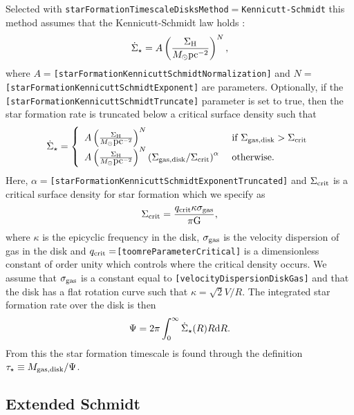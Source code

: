 Selected with {\tt starFormationTimescaleDisksMethod}$=${\tt Kennicutt-Schmidt} this method assumes that the Kennicutt-Schmidt law holds \citep{schmidt_rate_1959,kennicutt_global_1998}:
\begin{equation}
\dot{\Sigma}_\star = A \left({\Sigma_{\rm H} \over M_\odot \hbox{pc}^{-2}} \right)^N,
\end{equation}
where $A=${\tt [starFormationKennicuttSchmidtNormalization]} and $N=${\tt [starFormationKennicuttSchmidtExponent]} are parameters. Optionally, if the {\tt [starFormationKennicuttSchmidtTruncate]} parameter is set to true, then the star formation rate is truncated below a critical surface density such that
\begin{equation}
\dot{\Sigma}_\star = \left\{ \begin{array}{ll} A \left({\Sigma_{\rm H} \over M_\odot \hbox{pc}^{-2}} \right)^N & \hbox{ if } \Sigma_{\rm gas,disk} > \Sigma_{\rm crit} \\ A \left({\Sigma_{\rm H} \over M_\odot \hbox{pc}^{-2}} \right)^N \left(\Sigma_{\rm gas,disk}/\Sigma_{\rm crit}\right)^\alpha & \hbox{ otherwise.} \end{array} \right.
\end{equation}
Here, $\alpha=${\tt [starFormationKennicuttSchmidtExponentTruncated]} and $\Sigma_{\rm crit}$ is a critical surface density for star formation which we specify as
\begin{equation}
\Sigma_{\rm crit} = {q_{\rm crit} \kappa \sigma_{\rm gas} \over \pi \G},
\end{equation}
where $\kappa$ is the epicyclic frequency in the disk, $\sigma_{\rm gas}$ is the velocity dispersion of gas in the disk and $q_{\rm crit}=${\tt [toomreParameterCritical]} is a dimensionless constant of order unity which controls where the critical density occurs. We assume that $\sigma_{\rm gas}$ is a constant equal to {\tt [velocityDispersionDiskGas]} and that the disk has a flat rotation curve such that $\kappa = \sqrt{2} V/R$. The integrated star formation rate over the disk is then
\begin{equation}
\Psi = 2 \pi \int_0^\infty \dot{\Sigma}_\star(R) R \d R.
\end{equation}
From this the star formation timescale is found through the definition $\tau_\star \equiv M_{\rm gas, disk}/\Psi$.

\subsection{Extended Schmidt}\label{sec:StarFormationExtendedSchmidt}

